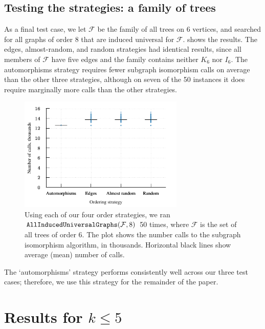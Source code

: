 \documentclass[12pt]{article}
\newcommand{\calF}{\ensuremath{\mathcal{F}}}
\begin{document}
\subsection{Testing the strategies: a family of trees}

As a final test case, we let $\calF$ be the family of all trees on 6 vertices,
and searched for all graphs of order 8 that are induced universal for $\calF$.
 shows the results. The edges, almost-random,
and random strategies had identical results, since all members of $\calF$ have five
edges and the family contains neither $K_6$ nor $I_6$.  The automorphisms strategy
requires fewer subgraph isomorphism calls on average than the other three strategies,
although on seven of the 50 instances it does require marginally more calls than
the other strategies.

\begin{figure}[htb]
    \centering

    \includegraphics*[width=0.7\textwidth]{img/second-experiment-plot-using-trees}

    \caption{Using each of our four order strategies, we ran
        $\FuncSty{AllInducedUniversalGraphs}(\calF,8)$ 50 times, where
        $\calF$ is the set of all trees of order 6. The plot
        shows the number calls to the subgraph isomorphism algorithm, in thousands.
        Horizontal black lines show average (mean) number of calls.}
\label{fig:second-experiment-using-trees}
\end{figure}

The `automorphisms' strategy performs consistently well across our three test
cases; therefore, we use this strategy for the remainder of the paper.

\section{Results for \texorpdfstring{$k \leq 5$}{k<=5}}\label{sec:results5}
\end{document}
